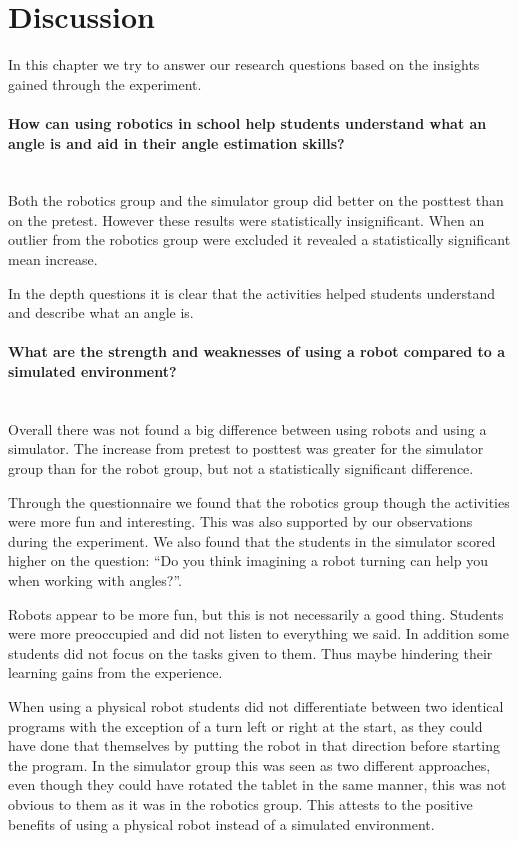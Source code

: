 \section{Discussion}
In this chapter we try to answer our research questions based on the insights gained through the experiment. 

\paragraph{How can using robotics in school help students understand what an angle is and aid in their angle estimation skills?}~\\
Both the robotics group and the simulator group did better on the posttest than on the pretest. However these results were statistically insignificant. When an outlier from the robotics group were excluded it revealed a statistically significant mean increase. 

In the depth questions it is clear that the activities helped students understand and describe what an angle is. 

\paragraph{What are the strength and weaknesses of using a robot compared to a simulated environment?}~\\
Overall there was not found a big difference between using robots and using a simulator.
The increase from pretest to posttest was greater for the simulator group than for the robot group, but not a statistically significant difference. 

Through the questionnaire we found that the robotics group though the activities were more fun and interesting. This was also supported by our observations during the experiment. We also found that the students in the simulator scored higher on the question: ``Do you think imagining a robot turning can help you
when working with angles?''. 

Robots appear to be more fun, but this is not necessarily a good thing. Students were more preoccupied and did not listen to everything we said. In addition some students did not focus on the tasks given to them. Thus maybe hindering their learning gains from the experience. 

When using a physical robot students did not differentiate between two identical programs with the exception of a turn left or right at the start, as they could have done that themselves by putting the robot in that direction before starting the program. In the simulator group this was seen as two different approaches, even though they could have rotated the tablet in the same manner, this was not obvious to them as it was in the robotics group. This attests to the positive benefits of using a physical robot instead of a simulated environment. 

